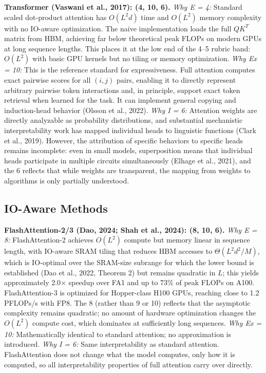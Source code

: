 \documentclass[10pt,twocolumn]{article}
\begin{document}
\textbf{Transformer (Vaswani et al., 2017): (4, 10, 6).}
\textit{Why E = 4:} Standard scaled dot-product attention has $O(L^2 d)$ time and $O(L^2)$ memory complexity with no IO-aware optimization. The naive implementation loads the full $QK^T$ matrix from HBM, achieving far below theoretical peak FLOPs on modern GPUs at long sequence lengths. This places it at the low end of the 4--5 rubric band: $O(L^2)$ with basic GPU kernels but no tiling or memory optimization. \textit{Why Ex = 10:} This is the reference standard for expressiveness. Full attention computes exact pairwise scores for all $(i,j)$ pairs, enabling it to directly represent arbitrary pairwise token interactions and, in principle, support exact token retrieval when learned for the task. It can implement general copying and induction-head behavior (Olsson et al., 2022). \textit{Why I = 6:} Attention weights are directly analyzable as probability distributions, and substantial mechanistic interpretability work has mapped individual heads to linguistic functions (Clark et al., 2019). However, the attribution of specific behaviors to specific heads remains incomplete: even in small models, superposition means that individual heads participate in multiple circuits simultaneously (Elhage et al., 2021), and the 6 reflects that while weights are transparent, the mapping from weights to algorithms is only partially understood.

\subsection*{IO-Aware Methods}

\textbf{FlashAttention-2/3 (Dao, 2024; Shah et al., 2024): (8, 10, 6).}
\textit{Why E = 8:} FlashAttention-2 achieves $O(L^2)$ compute but memory linear in sequence length, with IO-aware SRAM tiling that reduces HBM accesses to $\Theta(L^2d^2/M)$, which is IO-optimal over the SRAM-size subrange for which the lower bound is established (Dao et al., 2022, Theorem 2) but remains quadratic in $L$; this yields approximately 2.0$\times$ speedup over FA1 and up to 73\% of peak FLOPs on A100. FlashAttention-3 is optimized for Hopper-class H100 GPUs, reaching close to 1.2 PFLOPs/s with FP8. The 8 (rather than 9 or 10) reflects that the asymptotic complexity remains quadratic; no amount of hardware optimization changes the $O(L^2)$ compute cost, which dominates at sufficiently long sequences. \textit{Why Ex = 10:} Mathematically identical to standard attention; no approximation is introduced. \textit{Why I = 6:} Same interpretability as standard attention. FlashAttention does not change what the model computes, only how it is computed, so all interpretability properties of full attention carry over directly.
\end{document}
